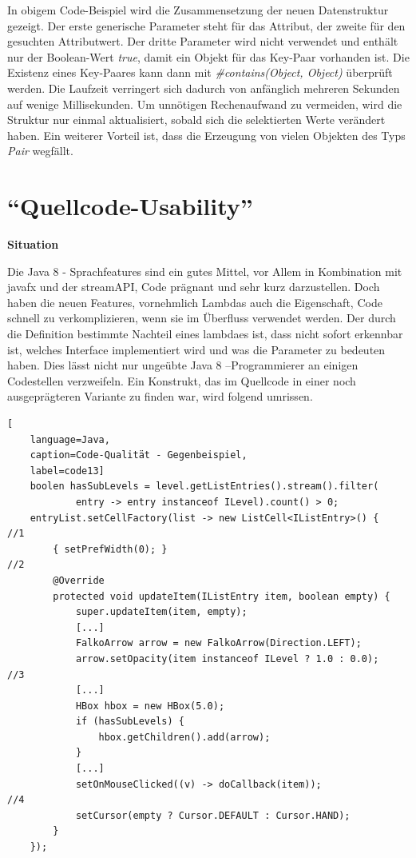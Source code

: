 In obigem Code-Beispiel wird die Zusammensetzung der neuen Datenstruktur gezeigt. Der erste generische Parameter steht für das Attribut, der zweite für den gesuchten Attributwert. Der dritte Parameter wird nicht verwendet und enthält nur der Boolean-Wert \textit{true}, damit ein Objekt für das Key-Paar vorhanden ist. Die Existenz eines Key-Paares kann dann mit \textit{\#contains(Object, Object)} überprüft werden. Die Laufzeit verringert sich dadurch von anfänglich mehreren Sekunden auf wenige Millisekunden. Um unnötigen Rechenaufwand zu vermeiden, wird die Struktur nur einmal aktualisiert, sobald sich die selektierten Werte verändert haben. Ein weiterer Vorteil ist, dass die Erzeugung von vielen Objekten des Typs \textit{Pair} wegfällt.
\section{\enquote{Quellcode-Usability}} \label{sec:quellcodeUsability}
\textbf{Situation}

Die Java 8 - Sprachfeatures sind ein gutes Mittel, vor Allem in Kombination mit \gls{javafx} und der \gls{streamAPI}, Code prägnant und sehr kurz darzustellen. Doch haben die neuen Features, vornehmlich Lambdas auch die Eigenschaft, Code schnell zu verkomplizieren, wenn sie im Überfluss verwendet werden. Der durch die Definition bestimmte Nachteil eines \gls{lambda}es ist, dass nicht sofort erkennbar ist, welches Interface implementiert wird und was die Parameter zu bedeuten haben. Dies lässt nicht nur ungeübte Java 8 –Programmierer an einigen Codestellen verzweifeln. Ein Konstrukt, das im Quellcode in einer noch ausgeprägteren Variante zu finden war, wird folgend umrissen.

\begin{lstlisting}[
    language=Java,
    caption=Code-Qualität - Gegenbeispiel,
    label=code13]
	boolen hasSubLevels = level.getListEntries().stream().filter(
			entry -> entry instanceof ILevel).count() > 0;
	entryList.setCellFactory(list -> new ListCell<IListEntry>() { 		//1
		{ setPrefWidth(0); } 																//2
		@Override
		protected void updateItem(IListEntry item, boolean empty) {
			super.updateItem(item, empty);
			[...]
			FalkoArrow arrow = new FalkoArrow(Direction.LEFT);
			arrow.setOpacity(item instanceof ILevel ? 1.0 : 0.0); 			//3
			[...]
			HBox hbox = new HBox(5.0);
			if (hasSubLevels) {
				hbox.getChildren().add(arrow);
			}
			[...]
			setOnMouseClicked((v) -> doCallback(item)); 						//4
			setCursor(empty ? Cursor.DEFAULT : Cursor.HAND);
		}
	});
\end{lstlisting}

